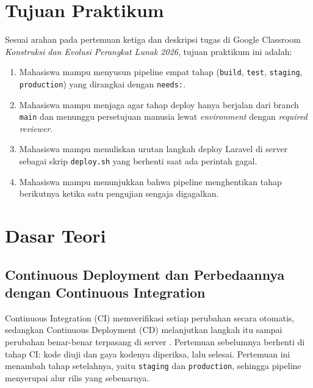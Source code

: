 \documentclass[a4paper,oneside,12pt]{report}
\begin{document}
\setcounter{page}{3}

\chapter[Tujuan Praktikum]{Tujuan Praktikum}
Sesuai arahan pada pertemuan ketiga dan deskripsi tugas di Google Classroom \textit{Konstruksi dan Evolusi Perangkat Lunak 2026}, tujuan praktikum ini adalah:
\begin{enumerate}
   \item Mahasiswa mampu menyusun pipeline empat tahap (\texttt{build}, \texttt{test}, \texttt{staging}, \texttt{production}) yang dirangkai dengan \texttt{needs:}.
   \item Mahasiswa mampu menjaga agar tahap deploy hanya berjalan dari branch \texttt{main} dan menunggu persetujuan manusia lewat \textit{environment} dengan \textit{required reviewer}.
   \item Mahasiswa mampu menuliskan urutan langkah deploy Laravel di server sebagai skrip \texttt{deploy.sh} yang berhenti saat ada perintah gagal.
   \item Mahasiswa mampu menunjukkan bahwa pipeline menghentikan tahap berikutnya ketika satu pengujian sengaja digagalkan.
\end{enumerate}

\clearpage

\chapter{Dasar Teori}

\section{Continuous Deployment dan Perbedaannya dengan Continuous Integration}
Continuous Integration (CI) memverifikasi setiap perubahan secara otomatis, sedangkan Continuous Deployment (CD) melanjutkan langkah itu sampai perubahan benar-benar terpasang di server \cite{fowler-ci,humble2010}. Pertemuan sebelumnya berhenti di tahap CI: kode diuji dan gaya kodenya diperiksa, lalu selesai. Pertemuan ini menambah tahap setelahnya, yaitu \texttt{staging} dan \texttt{production}, sehingga pipeline menyerupai alur rilis yang sebenarnya.
\end{document}
